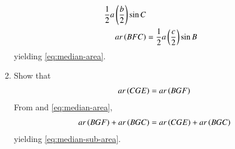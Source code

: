 \begin{enumerate}[label=\thesection.\arabic*.,ref=\thesection.\theenumi]
\begin{align}
	\frac{1}{2}a\left(\frac{b}{2}\right)\sin C 
	\\
	ar\left(BFC\right)&=
	\frac{1}{2}a\left(\frac{c}{2}\right)\sin  B
\end{align}
yielding
	\eqref{eq:median-area}.
\item 
	Show that
\begin{align}
	ar\left(CGE\right)
	=ar\left(BGF\right) 
	\label{eq:median-sub-area}
\end{align}
\solution 
From 
	and 
	\eqref{eq:median-area},
\begin{align}
	ar\left(BGF\right)
	+
	ar\left(BGC\right)
	=
	ar\left(CGE\right)
	+
	ar\left(BGC\right)
\end{align}
yielding 
	\eqref{eq:median-sub-area}.

\end{enumerate}
